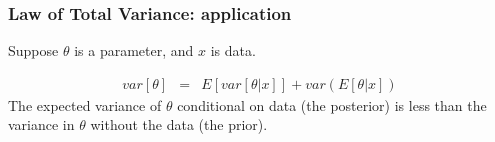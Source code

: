 \documentclass{beamer}
\numberwithin{equation}{section}
\begin{document}
\begin{frame}
\frametitle{Law of Total Variance: application}
Suppose $\theta$ is a parameter, and $x$ is data.

\begin{eqnarray}
var[\theta] & = & E[var[\theta|x]]+var(E[\theta|x]) \nonumber 
\end{eqnarray}
The expected variance of $\theta$ conditional on data (the posterior) is less than the variance in $\theta$ without the data (the prior).
\end{frame}
\end{document}

